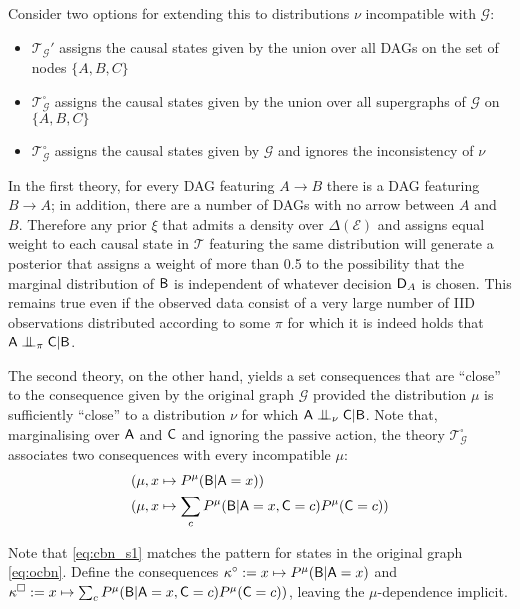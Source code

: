 Consider two options for extending this to distributions $\nu$ incompatible with $\mathcal{G}$:
\begin{itemize}
    \item $\mathscr{T}_{\mathcal{G}}'$ assigns the causal states given by the union over all DAGs on the set of nodes $\{A, B, C\}$
    \item $\mathscr{T}_{\mathcal{G}}^\square$ assigns the causal states given by the union over all supergraphs of $\mathcal{G}$ on $\{A, B, C\}$
    \item $\mathscr{T}_{\mathcal{G}}^\circ$ assigns the causal states given by $\mathcal{G}$ and ignores the inconsistency of $\nu$
\end{itemize}

In the first theory, for every DAG featuring $A\to B$ there is a DAG featuring $B\to A$; in addition, there are a number of DAGs with no arrow between $A$ and $B$. Therefore any prior $\xi$ that admits a density over $\Delta(\mathcal{E})$ and assigns equal weight to each causal state in $\mathcal{T}$ featuring the same distribution will generate a posterior that assigns a weight of more than 0.5 to the possibility that the marginal distribution of $\mathsf{B}$ is independent of whatever decision $\mathsf{D}_A$ is chosen. This remains true even if the observed data consist of a very large number of IID observations distributed according to some $\pi$ for which it is indeed holds that $\RV{A} \CI_\pi \RV{C} | \RV{B}$.

The second theory, on the other hand, yields a set consequences that are ``close'' to the consequence given by the original graph $\mathcal{G}$ provided the distribution $\mu$ is sufficiently ``close'' to a distribution $\nu$ for which $\RV{A} \CI_\nu \RV{C} | \RV{B}$. Note that, marginalising over $\mathsf{A}$ and $\mathsf{C}$ and ignoring the passive action, the theory $\mathscr{T}^\square_{\mathcal{G}}$ associates two consequences with every incompatible $\mu$:
\begin{align}
    &(\mu,x\mapsto P^\mu(\mathsf{B}|\mathsf{A}=x) )\label{eq:cbn_s1}\\
    &(\mu,x \mapsto \sum_c P^\mu(\mathsf{B}|\mathsf{A}=x,\mathsf{C}=c)P^\mu(\mathsf{C}=c)) \label{eq:cbn_s2}
\end{align}

Note that \ref{eq:cbn_s1} matches the pattern for states in the original graph \ref{eq:ocbn}. Define the consequences $\kappa^\circ := x\mapsto P^\mu(\mathsf{B}|\mathsf{A}=x)$ and $\kappa^\square:= x \mapsto \sum_c P^\mu(\mathsf{B}|\mathsf{A}=x,\mathsf{C}=c)P^\mu(\mathsf{C}=c))$, leaving the $\mu$-dependence implicit.

